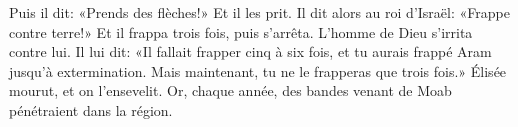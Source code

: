 Puis il dit: «Prends des flèches!»
	Et il les prit.
Il dit alors au roi d’Israël: «Frappe contre terre!»
	Et il frappa trois fois, puis s’arrêta.
L’homme de Dieu s’irrita contre lui. Il lui dit:
	«Il fallait frapper cinq à six fois, et tu aurais frappé Aram jusqu’à extermination.
	Mais maintenant, tu ne le frapperas que trois fois.»
Élisée mourut, et on l’ensevelit.
Or, chaque année, des bandes venant de Moab pénétraient dans la région.
